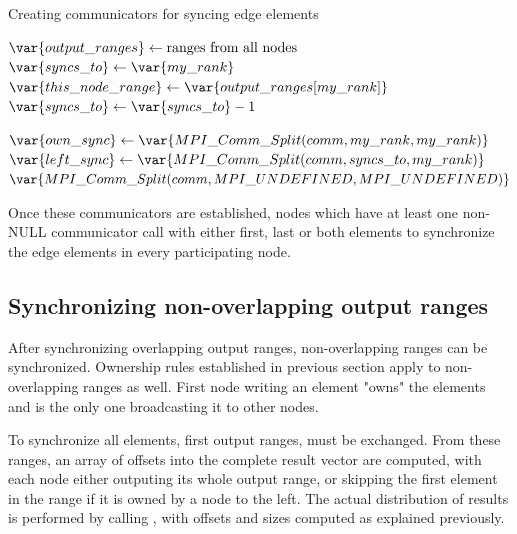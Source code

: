 \documentclass[thesis=M,english]{FITthesis}[2019/12/23]
\begin{document}
\begin{algorithm}
    \caption{Creating communicators for syncing edge elements}
    \begin{algorithmic}
        \State $\var{output\_ranges} \gets \text{ranges from all nodes}$
        \State $\var{syncs\_to} \gets \var{my\_rank}$
        \State $\var{this\_node\_range} \gets \var{output\_ranges[my\_rank]}$
        \State $\var{syncs\_to} \gets \var{syncs\_to} - 1$
        \EndWhile

        \State $\var{own\_sync} \gets \var{MPI\_Comm\_Split(comm, my\_rank, my\_rank)}$
        \State $\var{left\_sync} \gets \var{MPI\_Comm\_Split(comm, syncs\_to, my\_rank)}$
        \Else {}
        \State $\var{MPI\_Comm\_Split(comm, MPI\_UNDEFINED, MPI\_UNDEFINED)}$
        \EndIf
        \EndFor
        \EndFunction
    \end{algorithmic}
\end{algorithm}

Once these communicators are established, nodes which have at least one non-NULL
communicator call  with either first, last or both elements
to synchronize the edge elements in every participating node.


\subsection{Synchronizing non-overlapping output ranges}


After synchronizing overlapping output ranges, non-overlapping ranges can be synchronized.
Ownership rules established in previous section apply to non-overlapping ranges as well.
First node writing an element "owns" the elements and is the only one broadcasting it to
other nodes.

To synchronize all elements, first output ranges, must be exchanged. From these ranges,
an array of offsets into the complete result vector are computed, with each node
either outputing its whole output range, or skipping the first element in the range if
it is owned by a node to the left. The actual distribution of results is performed by calling , with
offsets and sizes computed as explained previously.
\end{document}

